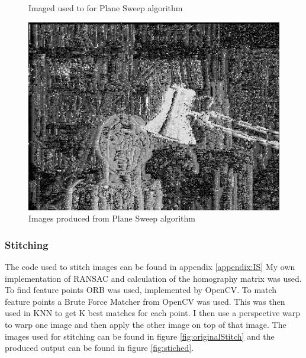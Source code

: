 \documentclass{article}
\begin{document}
    \begin{figure}[H]
        \centering
        \quad
        \caption{Imaged used to for Plane Sweep algorithm}
        \label{fig:psOrigi}
    \end{figure}
    \begin{figure}[H]
        \includegraphics[width=1\textwidth]{sd.png}
        \caption{Images produced from Plane Sweep algorithm}
        \label{fig:ps}
    \end{figure}
    \subsubsection{Stitching}
    The code used to stitch images can be found in appendix \ref{appendix:IS}
    My own implementation of RANSAC and calculation of the homography matrix was used. To find feature points
    ORB was used, implemented by OpenCV. To match feature points a Brute Force Matcher from OpenCV was used. This was then used in KNN to get K best matches
    for each point. I then use a perspective warp to warp one image and then apply the other image on top of that image. 
    The images used for stitching can be found in figure \ref{fig:originalStitch} and the produced output can be found in figure \ref{fig:stiched}.
\end{document}
